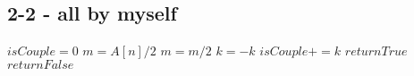 \documentclass[12pt]{article}
\begin{document}
\subsection*{2-2 - all by myself}
\begin{algorithmic}
    \State $isCouple = 0$
    \State $m = A[n]/2$
    \State $m=m/2$
    \State $k = -k$
    \EndIf
    \State $isCouple += k$
    \EndFor
    \State $return True$
    \Else
    \State $return False$
    \EndIf
    \EndProcedure
\end{algorithmic}
\end{document}
